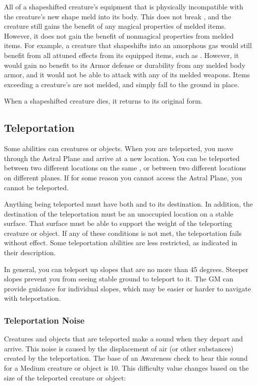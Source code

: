     All of a shapeshifted creature's equipment that is physically incompatible with the creature's new shape meld into its body.
    This does not break , and the creature still gains the benefit of any magical properties of melded items.
    However, it does not gain the benefit of nonmagical properties from melded items.
    For example, a creature that shapeshifts into an amorphous gas would still benefit from all attuned effects from its equipped items, such as .
    However, it would gain no benefit to its Armor defense or durability from any melded body armor, and it would not be able to attack with any of its melded weapons.
    Items exceeding a creature's  are not melded, and simply fall to the ground in place.

    When a shapeshifted creature dies, it returns to its original form.

  \subsection{Teleportation}\label{Teleportation}
    Some abilities can  creatures or objects.
    When you are teleported, you move through the Astral Plane and arrive at a new location.
    You can be teleported between two different locations on the same , or between two different locations on different planes.
    If for some reason you cannot access the Astral Plane, you cannot be teleported.

    Anything being teleported must have both  and  to its destination.
    In addition, the destination of the teleportation must be an unoccupied location on a stable surface.
    That surface must be able to support the weight of the teleporting creature or object.
    If any of these conditions is not met, the teleportation fails without effect.
    Some teleportation abilities are less restricted, as indicated in their description.

    In general, you can teleport up slopes that are no more than 45 degrees.
    Steeper slopes prevent you from seeing stable ground to teleport to it.
    The GM can provide guidance for individual slopes, which may be easier or harder to navigate with teleportation.

    \subsubsection{Teleportation Noise}\label{Teleportation Noise}
      Creatures and objects that are teleported make a sound when they depart and arrive.
      This noise is caused by the displacement of air (or other substances) created by the teleportation.
      The base  of an Awareness check to hear this sound for a Medium creature or object is 10.
      This difficulty value changes based on the size of the teleported creature or object:

